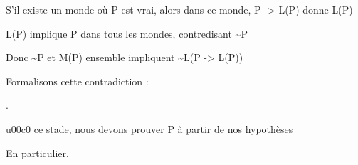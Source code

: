 \documentclass[10pt]{report}
\begin{document}
\begin{coqdoccode}
\begin{coqdoccomment}
\end{coqdoccomment}
\coqdoceol
\coqdocindent{2.00em}
\begin{coqdoccomment}
\coqdocindent{0.50em}
S'il\coqdocindent{0.50em}
existe\coqdocindent{0.50em}
un\coqdocindent{0.50em}
monde\coqdocindent{0.50em}
où\coqdocindent{0.50em}
P\coqdocindent{0.50em}
est\coqdocindent{0.50em}
vrai,\coqdocindent{0.50em}
alors\coqdocindent{0.50em}
dans\coqdocindent{0.50em}
ce\coqdocindent{0.50em}
monde,\coqdocindent{0.50em}
P\coqdocindent{0.50em}
->\coqdocindent{0.50em}
L(P)\coqdocindent{0.50em}
donne\coqdocindent{0.50em}
L(P)\coqdocindent{0.50em}
\end{coqdoccomment}
\coqdoceol
\coqdocindent{2.00em}
\begin{coqdoccomment}
\coqdocindent{0.50em}
L(P)\coqdocindent{0.50em}
implique\coqdocindent{0.50em}
P\coqdocindent{0.50em}
dans\coqdocindent{0.50em}
tous\coqdocindent{0.50em}
les\coqdocindent{0.50em}
mondes,\coqdocindent{0.50em}
contredisant\coqdocindent{0.50em}
\~{}P\coqdocindent{0.50em}
\end{coqdoccomment}
\coqdoceol
\coqdocemptyline
\coqdocindent{2.00em}
\begin{coqdoccomment}
\coqdocindent{0.50em}
Donc\coqdocindent{0.50em}
\~{}P\coqdocindent{0.50em}
et\coqdocindent{0.50em}
M(P)\coqdocindent{0.50em}
ensemble\coqdocindent{0.50em}
impliquent\coqdocindent{0.50em}
\~{}L(P\coqdocindent{0.50em}
->\coqdocindent{0.50em}
L(P))\coqdocindent{0.50em}
\end{coqdoccomment}
\coqdoceol
\coqdocemptyline
\coqdocindent{2.00em}
\begin{coqdoccomment}
\coqdocindent{0.50em}
Formalisons\coqdocindent{0.50em}
cette\coqdocindent{0.50em}
contradiction\coqdocindent{0.50em}
:\coqdocindent{0.50em}
\end{coqdoccomment}
\coqdoceol
\coqdocindent{2.00em}
 .\coqdoceol
\coqdocemptyline
\coqdocindent{2.00em}
\begin{coqdoccomment}
\coqdocindent{0.50em}
u00c0\coqdocindent{0.50em}
ce\coqdocindent{0.50em}
stade,\coqdocindent{0.50em}
nous\coqdocindent{0.50em}
devons\coqdocindent{0.50em}
prouver\coqdocindent{0.50em}
P\coqdocindent{0.50em}
à\coqdocindent{0.50em}
partir\coqdocindent{0.50em}
de\coqdocindent{0.50em}
nos\coqdocindent{0.50em}
hypothèses\coqdocindent{0.50em}
\end{coqdoccomment}
\coqdoceol
\coqdocindent{2.00em}
\begin{coqdoccomment}
\coqdocindent{0.50em}
En\coqdocindent{0.50em}
particulier,\coqdocindent{0.50em}

\end{coqdoccomment}
\end{coqdoccode}
\end{document}

